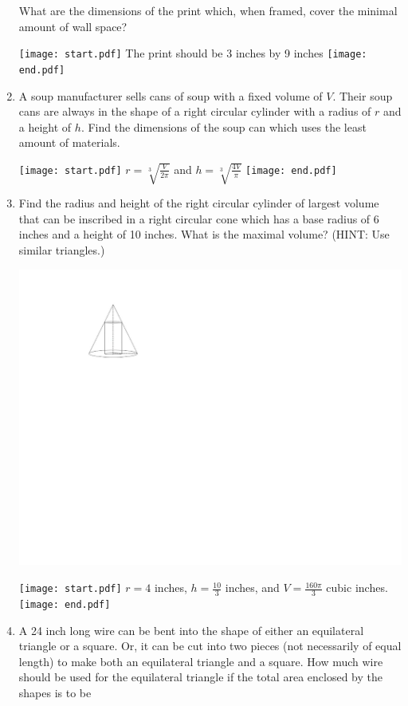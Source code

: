 \documentclass[12pt]{article}
\begin{document}
\begin{enumerate}
What are the dimensions of the print which, when framed, cover the minimal amount of wall space?

\texttt{[image: start.pdf]}
{{The print should be 3 inches by 9 inches}}
\texttt{[image: end.pdf]}


\item A soup manufacturer sells cans of soup with a fixed volume of $V$.  Their soup cans are always in the shape of a right circular cylinder with a radius of $r$ and a height of $h$.  Find the dimensions of the soup can which uses the least amount of materials.

\texttt{[image: start.pdf]}
{{$r=\sqrt[3]{\frac{V}{2\pi}}$ and $h=\sqrt[3]{\frac{4V}{\pi}}$}}
\texttt{[image: end.pdf]}


\item Find the radius and height of the right circular cylinder of largest volume that can be inscribed in a right circular cone which has a base radius of 6 inches and a height of 10 inches.  What is the maximal volume?  (HINT: Use similar triangles.)
\begin{center}
\includegraphics[scale=1]{cone.pdf}
\end{center}

\texttt{[image: start.pdf]}
{{$r=4$ inches, $h=\frac{10}{3}$ inches, and $V=\frac{160\pi}{3}$ cubic inches.}}
\texttt{[image: end.pdf]}


\item A 24 inch long wire can be bent into the shape of either an equilateral triangle or a square.  Or, it can be cut into two pieces (not necessarily of equal length) to make both an equilateral triangle and a square.  How much wire should be used for the equilateral triangle if the total area enclosed by the shapes is to be


\end{enumerate}
\end{document}
